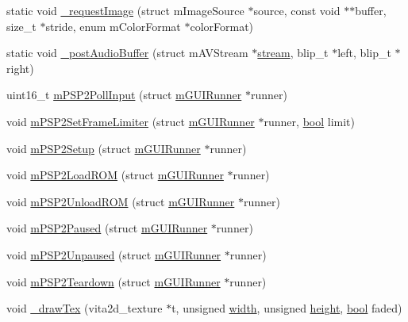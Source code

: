 \begin{DoxyCompactItemize}
static void \mbox{\hyperlink{psp2-context_8c_afd6bb33399978f5ee1d82f3b905f8eec}{\+\_\+request\+Image}} (struct m\+Image\+Source $\ast$source, const void $\ast$$\ast$buffer, size\+\_\+t $\ast$stride, enum m\+Color\+Format $\ast$color\+Format)
\item 
static void \mbox{\hyperlink{psp2-context_8c_a2505e2cf7b8b3afbc22087cc337213ac}{\+\_\+post\+Audio\+Buffer}} (struct m\+A\+V\+Stream $\ast$\mbox{\hyperlink{ioapi_8h_a4ed0a20697a8c37f8af699a8ec6d76a8}{stream}}, blip\+\_\+t $\ast$left, blip\+\_\+t $\ast$right)
\item 
uint16\+\_\+t \mbox{\hyperlink{psp2-context_8c_a29b280976db23268da118020f60ce728}{m\+P\+S\+P2\+Poll\+Input}} (struct \mbox{\hyperlink{structm_g_u_i_runner}{m\+G\+U\+I\+Runner}} $\ast$runner)
\item 
void \mbox{\hyperlink{psp2-context_8c_a9a298ef5f14d11b2cf482a19a3a55d82}{m\+P\+S\+P2\+Set\+Frame\+Limiter}} (struct \mbox{\hyperlink{structm_g_u_i_runner}{m\+G\+U\+I\+Runner}} $\ast$runner, \mbox{\hyperlink{libretro_8h_a4a26dcae73fb7e1528214a068aca317e}{bool}} limit)
\item 
void \mbox{\hyperlink{psp2-context_8c_a421c14012a9792c249822f943155921a}{m\+P\+S\+P2\+Setup}} (struct \mbox{\hyperlink{structm_g_u_i_runner}{m\+G\+U\+I\+Runner}} $\ast$runner)
\item 
void \mbox{\hyperlink{psp2-context_8c_a6d1428d32dd856760fa94b6a08e54ab2}{m\+P\+S\+P2\+Load\+R\+OM}} (struct \mbox{\hyperlink{structm_g_u_i_runner}{m\+G\+U\+I\+Runner}} $\ast$runner)
\item 
void \mbox{\hyperlink{psp2-context_8c_a94ad5d2964da6bad167ee85e5f021421}{m\+P\+S\+P2\+Unload\+R\+OM}} (struct \mbox{\hyperlink{structm_g_u_i_runner}{m\+G\+U\+I\+Runner}} $\ast$runner)
\item 
void \mbox{\hyperlink{psp2-context_8c_a7f9c754e1ebf551ba6e39e76d7135f91}{m\+P\+S\+P2\+Paused}} (struct \mbox{\hyperlink{structm_g_u_i_runner}{m\+G\+U\+I\+Runner}} $\ast$runner)
\item 
void \mbox{\hyperlink{psp2-context_8c_a02416ce4a85e3b948b2a1df34d901cb3}{m\+P\+S\+P2\+Unpaused}} (struct \mbox{\hyperlink{structm_g_u_i_runner}{m\+G\+U\+I\+Runner}} $\ast$runner)
\item 
void \mbox{\hyperlink{psp2-context_8c_aaae5f4b3a42c091f809836cec74d1cd7}{m\+P\+S\+P2\+Teardown}} (struct \mbox{\hyperlink{structm_g_u_i_runner}{m\+G\+U\+I\+Runner}} $\ast$runner)
\item 
void \mbox{\hyperlink{psp2-context_8c_a8c8e8d5d2406306e272f2388bb3a8e20}{\+\_\+draw\+Tex}} (vita2d\+\_\+texture $\ast$t, unsigned \mbox{\hyperlink{readppm_8c_a59b7c57bf1dc7c36ac7c8232cf5bb713}{width}}, unsigned \mbox{\hyperlink{readppm_8c_ac8b624a7354198da45f5797b93b883c9}{height}}, \mbox{\hyperlink{libretro_8h_a4a26dcae73fb7e1528214a068aca317e}{bool}} faded)
$$
\end{DoxyCompactItemize}
